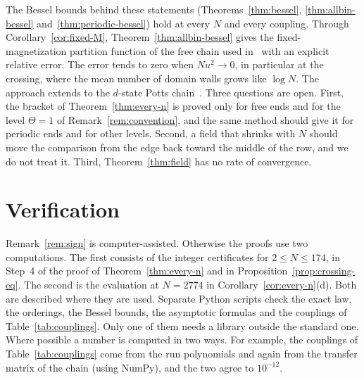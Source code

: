 \documentclass[11pt]{article}
\theoremstyle{definition}
\theoremstyle{remark}
\begin{document}
The Bessel bounds behind these statements (Theorems~\ref{thm:bessel},
\ref{thm:allbin-bessel} and~\ref{thm:periodic-bessel}) hold at every $N$ and
every coupling.
Through Corollary~\ref{cor:fixed-M}, Theorem~\ref{thm:allbin-bessel} gives the
fixed-magnetization partition function of the free chain used
in~\cite{dantchev2022,dantchev2024} with an explicit relative error. The error
tends to zero when $Nu^2\to0$, in particular at the crossing, where the mean number of
domain walls grows like $\log N$. The approach extends to
the $d$-state Potts chain~\cite{paperB}. Three questions are open. First, the
bracket of Theorem~\ref{thm:every-n} is proved only for free ends and for the
level $\Theta=1$ of Remark~\ref{rem:convention}, and the same method should give it
for periodic ends and for other levels. Second, a field that shrinks with $N$
should move the comparison from the edge back toward the middle of the row,
and we do not treat it. Third, Theorem~\ref{thm:field} has no rate of convergence.

\section{Verification}\label{sec:verify}

Remark~\ref{rem:sign} is computer-assisted. Otherwise the proofs use two
computations. The first consists of the integer certificates for $2\le N\le174$, in Step~4
of the proof of Theorem~\ref{thm:every-n} and in
Proposition~\ref{prop:crossing-eq}. The second is the evaluation at $N=2774$
in Corollary~\ref{cor:every-n}(d). Both are described where they are used.
Separate Python scripts check the exact law, the orderings, the Bessel
bounds, the asymptotic formulas and the couplings of
Table~\ref{tab:couplings}. Only one of them needs a library outside the
standard one. Where possible a number is computed in two ways. For example,
the couplings of Table~\ref{tab:couplings} come from the run polynomials and
again from the transfer matrix of the chain (using NumPy), and the two agree
to $10^{-12}$.
\end{document}
